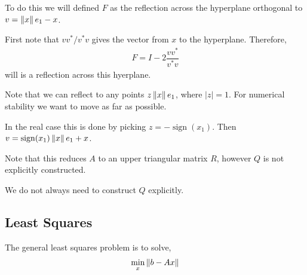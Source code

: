 \documentclass[12pt]{article}
\begin{document}
To do this we will defined \( F \) as the reflection across the hyperplane orthogonal to \( v = \left\lVert x\right\rVert e_1 - x \).

First note that \( vv^*/v^*v \) gives the vector from \( x \) to the hyperplane. Therefore,
\begin{align*}
    F = I - 2 \dfrac{vv^*}{v^*v}
\end{align*}
will is a reflection across this hyerplane.

Note that we can reflect to any points \( z\left\lVert x\right\rVert e_1 \), where \( |z|=1 \). For numerical stability we want to move as far as possible.

In the real case this is done by picking \( z = -\operatorname{sign}(x_1) \). Then \( v = \operatorname{sign}(x_1)\left\lVert x\right\rVert e_1 + x \).


\begin{algorithm}
\begin{algorithmic}
\EndFor
\end{algorithmic}
\end{algorithm}

Note that this reduces \( A \) to an upper triangular matrix \( R \), however \( Q \) is not explicitly constructed.

We do not always need to construct \( Q \) explicitly.
\begin{algorithm}
\begin{algorithmic}
\EndFor
\end{algorithmic}
\end{algorithm}

\begin{algorithm}
\begin{algorithmic}
\EndFor
\end{algorithmic}
\end{algorithm}

\subsection{Least Squares}
The general least squares problem is to solve,
\begin{align*}
    \min_{x} \left\lVert b-Ax\right\rVert
\end{align*}
\end{document}
